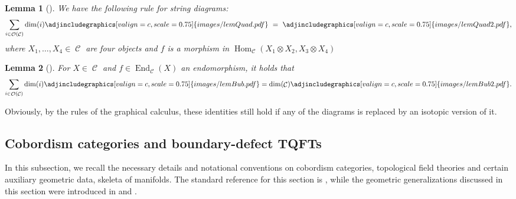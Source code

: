 \documentclass[pdftex]{sigma}
\DeclareMathOperator{\End}{End}
\DeclareMathOperator{\Hom}{Hom}
\DeclareMathOperator{\calc}{\mathcal{C}}
\DeclareMathOperator{\calo}{\mathcal{O}}
\numberwithin{equation}{section}
\newtheorem{Lemma}[Lemma]{Lemma}
\theoremstyle{definition}
\begin{document}
\begin{Lemma}[{\cite[Lemma~7]{FS}}]\label{lemQuad}
 We have the following rule for string diagrams:
 \begin{align*}
\sum_{i \in \calo(\calc)} \dim(i) \adjincludegraphics[valign=c, scale = 0.75]{images/lemQuad.pdf} \, \, = \, \, \adjincludegraphics[valign=c, scale = 0.75]{images/lemQuad2.pdf},
 \end{align*}
where ${X_1, \dots, X_4 \in \calc}$ are four objects and $f$ is a morphism in $\Hom_{\calc}(X_1 \otimes X_2, X_3 \otimes X_4)$
\end{Lemma}

\begin{Lemma}[{\cite[Lemma 8]{FS}}]\label{lemBub}
For $X \in \calc$ and $f \in \End_{\calc}(X)$ an endomorphism, it holds that
 \begin{align*}
\sum_{i \in \calo(\calc)} \dim(i) \adjincludegraphics[valign=c, scale = 0.75]{images/lemBub.pdf} =   \dim(\calc) \adjincludegraphics[valign=c, scale = 0.75]{images/lemBub2.pdf}.
 \end{align*}
\end{Lemma}
Obviously, by the rules of the graphical calculus, these identities still hold if any of the diagrams is replaced by an isotopic version of it.

\subsection{Cobordism categories and boundary-defect TQFTs}
\label{subSecTQFTs}
In this subsection, we recall the necessary details and notational conventions on cobordism categories, topological field theories and certain auxiliary geometric data, skeleta of manifolds. The standard reference for this section is \cite{TV}, while the geometric generalizations discussed in this section were introduced in \cite{F} and \cite{FS}.
\end{document}
